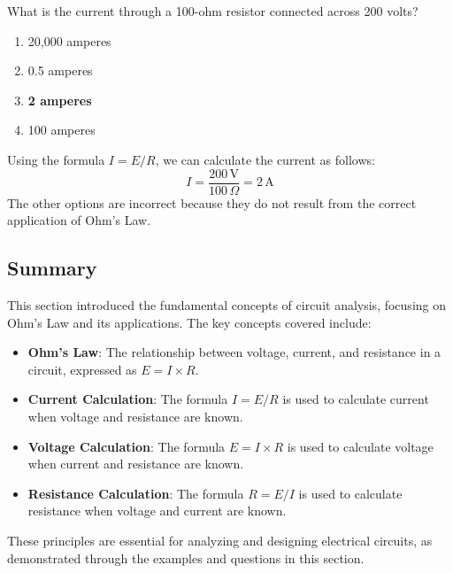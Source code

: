 
\begin{tcolorbox}[colback=gray!10!white,colframe=black!75!black,title={T5D08}]
    What is the current through a 100-ohm resistor connected across 200 volts?
    \begin{enumerate}[label=\Alph*),noitemsep]
        \item 20,000 amperes
        \item 0.5 amperes
        \item \textbf{2 amperes}
        \item 100 amperes
    \end{enumerate}
\end{tcolorbox}
Using the formula \(I = E / R\), we can calculate the current as follows:
\[
I = \frac{200\, \text{V}}{100\, \Omega} = 2\, \text{A}
\]
The other options are incorrect because they do not result from the correct application of Ohm's Law.


\subsection*{Summary}
This section introduced the fundamental concepts of circuit analysis, focusing on Ohm's Law and its applications. The key concepts covered include:

\begin{itemize}
    \item \textbf{Ohm's Law}: The relationship between voltage, current, and resistance in a circuit, expressed as \(E = I \times R\).
    \item \textbf{Current Calculation}: The formula \(I = E / R\) is used to calculate current when voltage and resistance are known.
    \item \textbf{Voltage Calculation}: The formula \(E = I \times R\) is used to calculate voltage when current and resistance are known.
    \item \textbf{Resistance Calculation}: The formula \(R = E / I\) is used to calculate resistance when voltage and current are known.
\end{itemize}

These principles are essential for analyzing and designing electrical circuits, as demonstrated through the examples and questions in this section.

